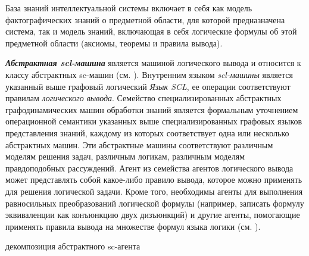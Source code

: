 База знаний интеллектуальной системы включает в себя как модель фактографических знаний о предметной области, для которой предназначена система, так и модель знаний, включающая в себя логические формулы об этой предметной области (аксиомы, теоремы и правила вывода).

\textit{\textbf{Абстрактная scl-машина}} является машиной логического вывода и относится к классу абстрактных sc-машин (см. ). Внутренним языком \textit{scl-машины} является указанный выше графовый логический \textit{Язык SCL}, ее операции соответствуют правилам \textit{логического вывода}. Семейство специализированных абстрактных графодинамических машин обработки знаний является формальным уточнением операционной семантики указанных выше специализированных графовых языков представления знаний, каждому из которых соответствует одна или несколько абстрактных машин. Эти абстрактные машины соответствуют различным моделям решения задач, различным логикам, различным моделям правдоподобных рассуждений. 
Агент из семейства агентов логического вывода может представлять собой какое-либо правило вывода, которое можно применять для решения логической задачи. Кроме того, необходимы агенты для выполнения равносильных преобразований логической формулы (например, записать формулу эквиваленции как конъюнкцию двух дизъюнкций) и другие агенты, помогающие применять правила вывода на множестве формул языка логики (см. ).

\begin{SCn}
\begin{scnrelfromset}{декомпозиция абстрактного sc-агента}
\end{scnrelfromset}
\begin{scnindent}
\end{scnindent}
\end{SCn}

